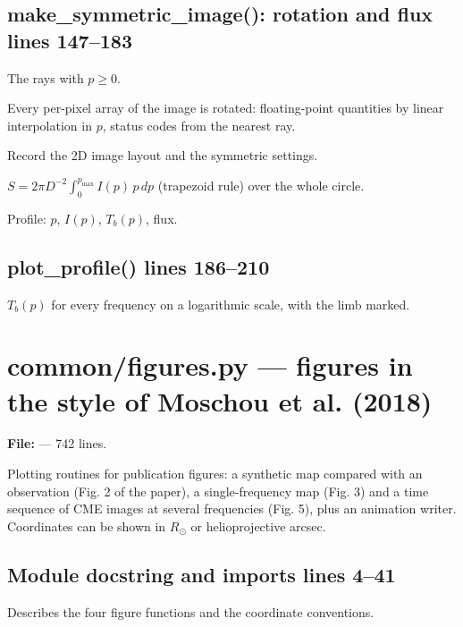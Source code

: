 \section*{\normalsize make\_symmetric\_image(): rotation and flux \hfill{\small\mdseries\color{gray}lines 147--183}}

\begin{lines}
\item[L.148–150] The rays with $p\ge0$.
\item[L.156–167] Every per-pixel array of the image is rotated: floating-point quantities by linear interpolation in $p$, status codes from the nearest ray.
\item[L.169] Record the 2D image layout and the symmetric settings.
\item[L.173–174] $S=2\pi D^{-2}\int_0^{p_\text{max}}I(p)\,p\,dp$ (trapezoid rule) over the whole circle.
\item[L.177] Profile: $p$, $I(p)$, $T_b(p)$, flux.
\end{lines}
\section*{\normalsize plot\_profile() \hfill{\small\mdseries\color{gray}lines 186--210}}

$T_b(p)$ for every frequency on a logarithmic scale, with the limb marked.


\chapter{common/figures.py --- figures in the style of Moschou et al. (2018)}
\label{mod:common:figures.py}
\textbf{File:}  --- 742 lines.

Plotting routines for publication figures: a synthetic map compared with an
observation (Fig. 2 of the paper), a single-frequency map (Fig. 3) and a time
sequence of CME images at several frequencies (Fig. 5), plus an animation writer.
Coordinates can be shown in $R_\odot$ or helioprojective arcsec.

\section*{\normalsize Module docstring and imports \hfill{\small\mdseries\color{gray}lines 4--41}}

Describes the four figure functions and the coordinate conventions.


